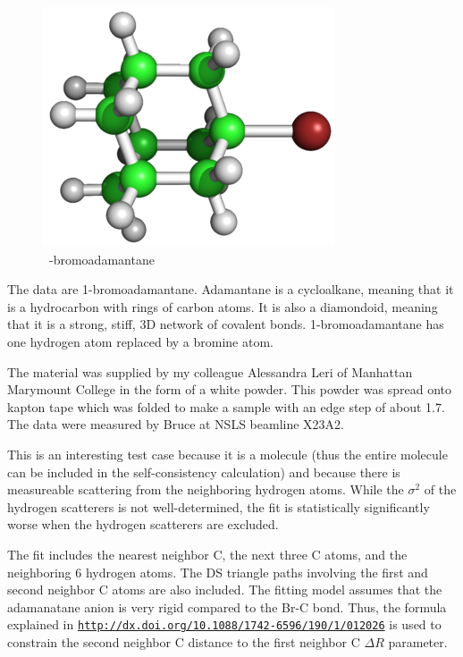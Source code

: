 \documentclass{article}
\begin{document}
\begin{figure}
  \includegraphics[width=\linewidth]{bromoadamantane/bromoadamantane.png}
  \caption{~\hfill{}-bromoadamantane}
\end{figure}

The data are 1-bromoadamantane.  Adamantane is a cycloalkane, meaning
that it is a hydrocarbon with rings of carbon atoms.  It is also a
diamondoid, meaning that it is a strong, stiff, 3D network of covalent
bonds.  1-bromoadamantane has one hydrogen atom replaced by a bromine
atom.

The material was supplied by my colleague Alessandra Leri of Manhattan
Marymount College in the form of a white powder.  This powder was
spread onto kapton tape which was folded to make a sample with an edge
step of about 1.7.  The data were measured by Bruce at NSLS beamline
X23A2.

This is an interesting test case because it is a molecule (thus the
entire molecule can be included in the self-consistency calculation)
and because there is measureable scattering from the neighboring
hydrogen atoms.  While the $\sigma^2$ of the hydrogen scatterers is not
well-determined, the fit is statistically significantly worse when the
hydrogen scatterers are excluded.

The fit includes the nearest neighbor C, the next three C atoms, and
the neighboring 6 hydrogen atoms.  The DS triangle paths involving the
first and second neighbor C atoms are also included.  The fitting
model assumes that the adamanatane anion is very rigid compared to the
Br-C bond.  Thus, the formula explained in 
\href{http://dx.doi.org/10.1088/1742-6596/190/1/012026}%
{\texttt{http://dx.doi.org/10.1088/1742-6596/190/1/012026}} is used to
constrain the second neighbor C distance to the first neighbor C
$\Delta R$ parameter.
\end{document}
